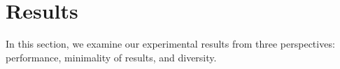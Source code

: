 \section{Results}
\label{sec:results}

\newcommand{\takeaway}[1]{
\vspace{6pt}
\noindent\fbox{\parbox{0.975\columnwidth}{#1}}
\vspace{6pt}
}

In this section, we examine our experimental results from three perspectives: performance, minimality of \ucalg results, and diversity.
%
%
%
%
%
%
%

